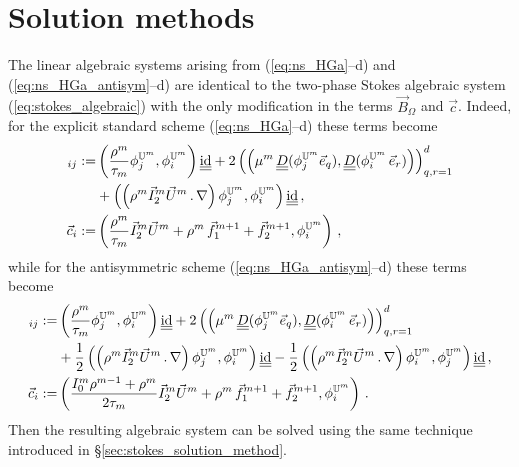 \section{Solution methods}\label{sec:ns_solution_method}
The linear algebraic systems arising from (\ref{eq:ns_HGa}--d) and
(\ref{eq:ns_HGa_antisym}--d) are identical to the two-phase Stokes
algebraic system (\ref{eq:stokes_algebraic}) with the only modification in
the terms $\vec B_{\Omega}$ and $\vec c$. Indeed, for the explicit
standard scheme (\ref{eq:ns_HGa}--d) these terms become
\begin{align*}
[\vec B_\Omega]_{ij} := & \left( \frac{\rho^m}{\tau_m} \phi_j^{\uspacesimple^m},
\phi_i^{\uspacesimple^m} \right)\mat \id
+ 2\left(\left(\mu^m\,\mat D(\phi_j^{\uspacesimple^m} \vec e_q),
\mat D(\phi_i^{\uspacesimple^m}\,\vec e_r) \right) \right)_{q,r=1}^d\\
& + \left( \left(\rho^m \vec I_2^m\vec U^m\,.\,\nabla \right)
\phi_j^{\uspacesimple^m},
\phi_i^{\uspacesimple^m} \right)\mat \id \,,\\
\vec c_i := &\left( \frac{\rho^m}{\tau_m}\vec I_2^m\vec U^m +
\rho^m\,\vec f_1^{m+1}+\vec f_2^{m+1},\phi_i^{\uspacesimple^m}\right)\,,
\end{align*}
while for the antisymmetric scheme (\ref{eq:ns_HGa_antisym}--d) these terms
become
\begin{align*}
[\vec B_\Omega]_{ij} := & \left( \frac{\rho^m}{\tau_m} \phi_j^{\uspacesimple^m},
\phi_i^{\uspacesimple^m} \right)\mat \id
+ 2\left(\left(\mu^m\,\mat D(\phi_j^{\uspacesimple^m} \vec e_q),
\mat D(\phi_i^{\uspacesimple^m}\,\vec e_r) \right) \right)_{q,r=1}^d\\
& + \frac{1}{2}\left( \left(\rho^m \vec I_2^m\vec U^m\,.\,\nabla \right)
\phi_j^{\uspacesimple^m}, \phi_i^{\uspacesimple^m} \right)\mat \id
-\frac{1}{2}\left( \left(\rho^m \vec I_2^m\vec U^m\,.\,\nabla \right)
\phi_i^{\uspacesimple^m}, \phi_j^{\uspacesimple^m} \right)\mat \id \,,\\
\vec c_i := &\left( \frac{I^m_0\rho^{m-1}+\rho^m}{2\tau_m}\vec I_2^m \vec U^m
+ \rho^m\,\vec f_1^{m+1}+\vec f_2^{m+1},\phi_i^{\uspacesimple^m}\right)\,.
\end{align*}
Then the resulting algebraic system can be solved using the same technique
introduced in \S\ref{sec:stokes_solution_method}.

